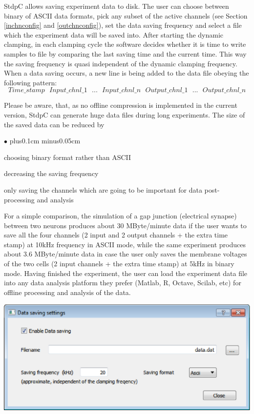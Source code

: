 \documentclass{article}
\newenvironment{myitem}{\begin{list}{$\bullet$}{\setlength{\leftmargin}{1.1em}
\itemsep0.1cm plus0.1cm minus0.05cm
\listparindent0cm
\addtolength{\labelsep}{0.5\labelsep}
\setlength{\labelwidth}{0.8em}
\setlength{\leftmargin}{\labelwidth}
\addtolength{\leftmargin}{\labelsep}
}}{\end{list}}
\begin{document}
StdpC allows saving experiment data to disk.
The user can choose between binary of ASCII data formats, pick
any subset of the active channels (see Section \ref{inchnconfig} and
\ref{outchnconfig}), set the data saving frequency and select a file which the
experiment data will be saved into. After starting the dynamic clamping, in
each clamping cycle the software decides whether it is time to write samples
to file by comparing the last saving time and the current time. This way the
saving frequency is quasi independent of the dynamic clamping
frequency. When a data saving occurs, a new line is being added to the
data file obeying the following pattern:
\begin{equation*}
Time\_stamp\ \ \ Input\_chnl\_1
\ \ \ ...\ \ \ Input\_chnl\_n\ \ \  Output\_chnl\_1\ \ \ ...\ \ \ Output\_chnl\_n  
\end{equation*}

Please be aware, that, as no offline compression is implemented in the
current version, StdpC can generate huge data files during long
experiments. The size of the saved data can be reduced by
\begin{myitem} 
\item choosing binary format rather than ASCII
\item decreasing the saving frequency
\item only saving the channels which are going to be important for data
  post-processing and analysis
\end{myitem}
For a simple comparison, the simulation of a gap junction (electrical
synapse) between two neurons produces about 30 MByte/minute data if the
user wants to save all the four channels (2 input and 2 output channels
+ the extra time stamp) at 10kHz frequency in ASCII mode, while the same
experiment produces about 3.6 MByte/minute data in case the user only saves the
membrane voltages of the two cells (2 input channels + the extra time
stamp) at 5kHz in binary mode. 
Having finished the experiment, the user can load the experiment data file
into any data analysis platform they prefer (Matlab, R, Octave, Scilab,
etc) for offline processing and analysis of the data.

\noindent
\includegraphics[scale=0.6]{dataSavingDialog}\\
\end{document}
